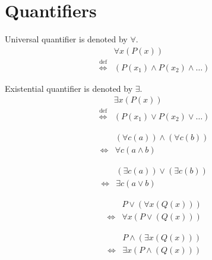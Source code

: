 \section{Quantifiers}
\begin{defn}
Universal quantifier is denoted by $\forall$.
\begin{align*}
& \forall x (P(x)) \\
\overset{\operatorname{def}}{\iff} & (P(x_1) \land P(x_2) \land \dots)
\end{align*}
\end{defn}

\begin{defn}
Existential quantifier is denoted by $\exists$.
\begin{align*}
& \exists x (P(x)) \\
\overset{\operatorname{def}}{\iff} & (P(x_1) \lor P(x_2) \lor \dots)
\end{align*}
\end{defn}

\begin{prop}
\label{Proposition:forall_land_commutativity}
\begin{align*}
& (\forall c (a)) \land (\forall c (b)) \\
\iff & \forall c (a \land b)
\end{align*}
\end{prop}

\begin{prop}
\label{Proposition:exists_lor_commutativity}
\begin{align*}
& (\exists c (a)) \lor (\exists c (b)) \\
\iff & \exists c (a \lor b)
\end{align*}
\end{prop}

\begin{prop}
\label{Proposition:lor_forall_distributivity}
\begin{align*}
& P \lor (\forall x (Q(x))) \\
\iff & \forall x (P \lor (Q(x)))
\end{align*}
\end{prop}

\begin{prop}
\label{Proposition:land_exists_distributivity}
\begin{align*}
& P \land (\exists x (Q(x))) \\
\iff & \exists x (P \land (Q(x)))
\end{align*}
\end{prop}

